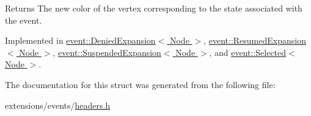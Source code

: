\begin{DoxyReturn}{Returns}
The new color of the vertex corresponding to the state associated with the event. 
\end{DoxyReturn}


Implemented in \hyperlink{structevent_1_1DeniedExpansion_a369a406bce1f609963986f2847e50d3c}{event\+::\+Denied\+Expansion$<$ Node $>$}, \hyperlink{structevent_1_1ResumedExpansion_abfe2350951662756ec5ed9fcbed0e212}{event\+::\+Resumed\+Expansion$<$ Node $>$}, \hyperlink{structevent_1_1SuspendedExpansion_a894dc487c1c147092c4c4313588becbb}{event\+::\+Suspended\+Expansion$<$ Node $>$}, and \hyperlink{structevent_1_1Selected_abe0f36112e9cea58139b7265091d690e}{event\+::\+Selected$<$ Node $>$}.



The documentation for this struct was generated from the following file\+:\begin{DoxyCompactItemize}
\item 
extensions/events/\hyperlink{extensions_2events_2headers_8h}{headers.\+h}\end{DoxyCompactItemize}
